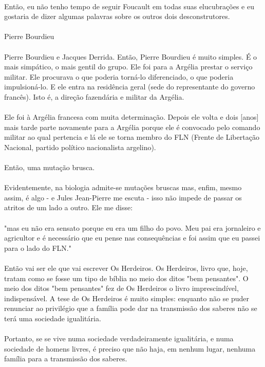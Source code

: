 \documentclass[10pt,a4paper]{book}
\begin{document}
	\\
	Então, eu não tenho tempo de seguir Foucault em todas suas elucubrações e eu gostaria de dizer algumas palavras sobre os outros dois desconstrutores.\\
	\\
	Pierre Bourdieu\\
	\\
	Pierre Bourdieu e Jacques Derrida. Então, Pierre Bourdieu é muito simples. É o mais simpático, o mais gentil do grupo. Ele foi para a Argélia prestar o serviço militar. Ele procurava o que poderia torná-lo diferenciado, o que poderia impulsioná-lo. E ele entra na residência geral (sede do representante do governo francês). Isto é, a direção fazendária e militar da Argélia.\\
	\\
	Ele foi à Argélia francesa com muita determinação. Depois ele volta e dois [anos] mais tarde parte novamente para a Argélia porque ele é convocado pelo comando militar ao qual pertencia e lá ele se torna membro do FLN (Frente de Libertação Nacional, partido político nacionalista argelino).\\
	\\
	Então, uma mutação brusca.\\
	\\
	Evidentemente, na biologia admite-se mutações bruscas mas, enfim, mesmo assim, é algo - e Jules Jean-Pierre me escuta - isso não impede de passar os atritos de um lado a outro. Ele me disse: \\
	\\
	"mas eu não era sensato porque eu era um filho do povo. Meu pai era jornaleiro e agricultor e é necessário que eu pense nas consequências e foi assim que eu passei para o lado do FLN."\\
	\\
	Então vai ser ele que vai escrever Os Herdeiros. Os Herdeiros, livro que, hoje, tratam como se fosse um tipo de bíblia no meio dos ditos "bem pensantes". O meio dos ditos "bem pensantes" fez de Os Herdeiros o livro imprescindível, indispensável. A tese de Os Herdeiros é muito simples: enquanto não se puder renunciar ao privilégio que a família pode dar na transmissão dos saberes não se terá uma sociedade igualitária.\\
	\\
	Portanto, se se vive numa sociedade verdadeiramente igualitária, e numa sociedade de homens livres, é preciso que não haja, em nenhum lugar, nenhuma família para a transmissão dos saberes.\\
\end{document}
